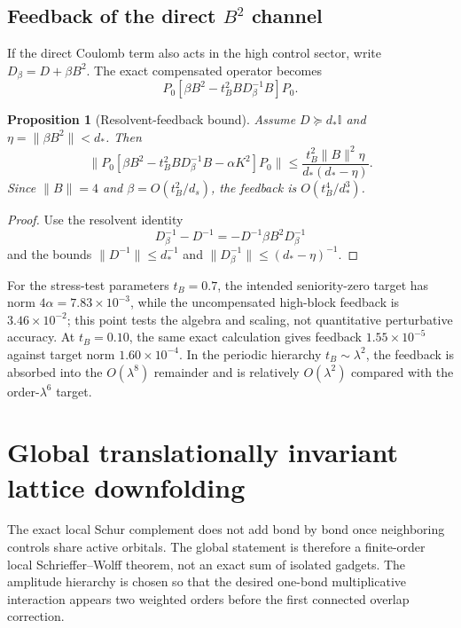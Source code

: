 \documentclass[11pt]{article}
\newtheorem{proposition}[theorem]{Proposition}
\theoremstyle{definition}
\theoremstyle{remark}
\newcommand{\Id}{\mathbb I}
\newcommand{\norm}[1]{\lVert #1\rVert}
\begin{document}
\subsection{Feedback of the direct \texorpdfstring{$B^2$}{B-squared} channel}

If the direct Coulomb term also acts in the high control sector, write $D_\beta=D+\beta B^2$.  The exact compensated operator becomes
\begin{equation}
 P_0[\beta B^2-t_B^2BD_\beta^{-1}B]P_0.
\end{equation}

\begin{proposition}[Resolvent-feedback bound]
\label{prop:feedback}
Assume $D\succeq d_*\Id$ and $\eta=\norm{\beta B^2}<d_*$.  Then
\begin{equation}
\boxed{
\norm{P_0[\beta B^2-t_B^2BD_\beta^{-1}B-\alpha K^2]P_0}
\le\frac{t_B^2\norm{B}^2\eta}{d_*(d_*-\eta)}.
}
\label{eq:feedback-bound}
\end{equation}
Since $\norm{B}=4$ and $\beta=O(t_B^2/d_s)$, the feedback is $O(t_B^4/d_*^3)$.
\end{proposition}

\begin{proof}
Use the resolvent identity
\begin{equation}
 D_\beta^{-1}-D^{-1}=-D^{-1}\beta B^2D_\beta^{-1}
\end{equation}
and the bounds $\norm{D^{-1}}\le d_*^{-1}$ and $\norm{D_\beta^{-1}}\le(d_*-\eta)^{-1}$.
\end{proof}

For the stress-test parameters $t_B=0.7$, the intended seniority-zero target has norm $4\alpha=7.83\times10^{-3}$, while the uncompensated high-block feedback is $3.46\times10^{-2}$; this point tests the algebra and scaling, not quantitative perturbative accuracy.  At $t_B=0.10$, the same exact calculation gives feedback $1.55\times10^{-5}$ against target norm $1.60\times10^{-4}$.  In the periodic hierarchy $t_B\sim\lambda^2$, the feedback is absorbed into the $O(\lambda^8)$ remainder and is relatively $O(\lambda^2)$ compared with the order-$\lambda^6$ target.
\section{Global translationally invariant lattice downfolding}
\label{sec:global}

The exact local Schur complement does not add bond by bond once neighboring controls share active orbitals.  The global statement is therefore a finite-order local Schrieffer--Wolff theorem, not an exact sum of isolated gadgets.  The amplitude hierarchy is chosen so that the desired one-bond multiplicative interaction appears two weighted orders before the first connected overlap correction.
\end{document}
